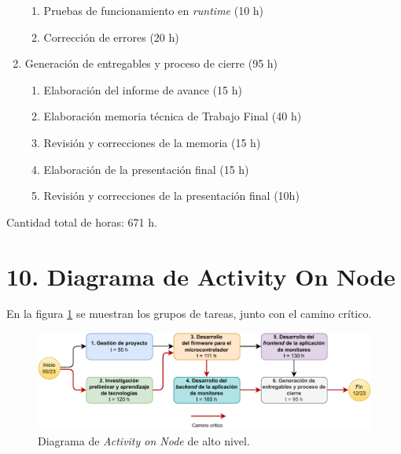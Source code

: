 \documentclass[
11pt, %
]{charter}
\begin{document}
\begin{enumerate}
\begin{enumerate}
		\item Pruebas de funcionamiento en \textit{runtime} (10 h)
		\item Corrección de errores (20 h)
	\end{enumerate}
	\item Generación de entregables y proceso de cierre (95 h)
	\begin{enumerate}
		\item Elaboración del informe de avance (15 h)
		\item Elaboración memoria técnica de Trabajo Final (40 h)
		\item Revisión y correcciones de la memoria (15 h)
		\item Elaboración de la presentación final (15 h)
		\item Revisión y correcciones de la presentación final (10h)
	\end{enumerate}
\end{enumerate}

Cantidad total de horas: 671 h.

\section{10. Diagrama de Activity On Node}
\label{sec:AoN}
En la figura \ref{fig:AoN_lt} se muestran los grupos de tareas, junto con el camino crítico.
\begin{figure}[htpb]
\centering 
\includegraphics[width=.9\textwidth]{./Figuras/AON_Light.pdf}
\caption{Diagrama de \textit{Activity on Node} de alto nivel.}
\label{fig:AoN_lt}
\end{figure}
\end{document}
